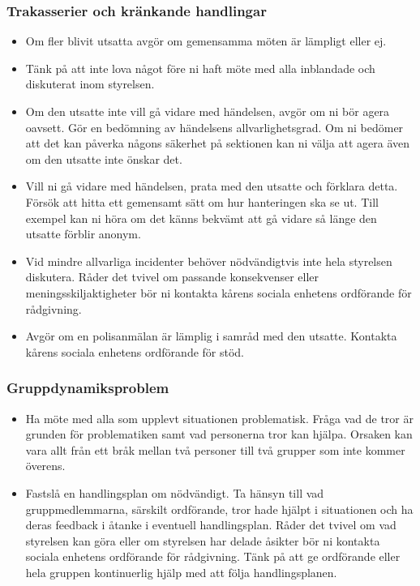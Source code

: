 \documentclass{dtek}
\begin{document}
\subsubsection{Trakasserier och kränkande handlingar}
\begin{itemize}
    \item Om fler blivit utsatta avgör om gemensamma möten är lämpligt eller ej. 
    \item Tänk på att inte lova något före ni haft möte med alla inblandade och diskuterat inom styrelsen.
    \item Om den utsatte inte vill gå vidare med händelsen, avgör om ni bör agera oavsett. Gör en bedömning av händelsens allvarlighetsgrad. Om ni bedömer att det kan påverka någons säkerhet på sektionen kan ni välja att agera även om den utsatte inte önskar det.
    \item Vill ni gå vidare med händelsen, prata med den utsatte och förklara detta. Försök att hitta ett gemensamt sätt om hur hanteringen ska se ut. Till exempel kan ni höra om det känns bekvämt att gå vidare så länge den utsatte förblir anonym.
    \item Vid mindre allvarliga incidenter behöver nödvändigtvis inte hela styrelsen diskutera. Råder det tvivel om passande konsekvenser eller meningsskiljaktigheter bör ni kontakta kårens sociala enhetens ordförande för rådgivning.
    \item Avgör om en polisanmälan är lämplig i samråd med den utsatte. Kontakta kårens sociala enhetens ordförande för stöd. 
\end{itemize}

\subsubsection{Gruppdynamiksproblem}
\begin{itemize}
    \item Ha möte med alla som upplevt situationen problematisk. Fråga vad de tror är grunden för problematiken samt vad personerna tror kan hjälpa. Orsaken kan vara allt från ett bråk mellan två personer till två grupper som inte kommer överens. 

    \item Fastslå en handlingsplan om nödvändigt. Ta hänsyn till vad gruppmedlemmarna, särskilt ordförande,  tror hade hjälpt i situationen och ha deras feedback i åtanke i eventuell handlingsplan. Råder det tvivel om  vad styrelsen kan göra eller om styrelsen har delade åsikter bör ni kontakta sociala enhetens  ordförande för rådgivning. Tänk på att ge ordförande eller hela gruppen kontinuerlig hjälp med att följa handlingsplanen.
\end{itemize}
\end{document}

